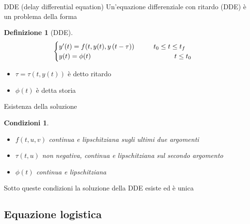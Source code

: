 \documentclass[intlimits]{beamer}
\numberwithin{equation}{section}
\theoremstyle{plain}
\newtheorem{cond}{Condizioni}[section]
\theoremstyle{definition}
\newtheorem{defin}[teor]{Definizione}
\theoremstyle{remark}
\begin{document}
\begin{frame}{DDE (delay differential equation)}
 Un'equazione differenziale con ritardo (DDE) è un problema della forma

\pause

\vspace{1cm}

\begin{defin}[DDE]
$$
\begin{cases}
 y'(t)=f(t,y(t),y \left( t-\tau \right))	\hspace{1cm}	t_0 \le t \le t_f		\\
 y(t)=\phi(t)					\hspace{4.35cm}		t \le t_0
\end{cases}
$$
\end{defin}

\pause

\vspace{1cm}

\begin{itemize}[<+->]
 \item $\tau=\tau(t,y(t))$ è detto ritardo
 \item $\phi(t)$ è detta storia
\end{itemize}

\end{frame}


\begin{frame}{Esistenza della soluzione}

\pause
\begin{cond}
 \begin{itemize}[<+->]
 \item $f(t,u,v)$ continua e lipschitziana sugli ultimi due argomenti
 \item $\tau(t,u)$  non negativa, continua e lipschitziana sul secondo argomento
 \item $\phi(t)$  continua e lipschitziana
\end{itemize}
\end{cond}

\pause

\vspace{1cm}
Sotto queste condizioni la soluzione della DDE esiste ed è unica
 
\end{frame}

\subsection{Equazione logistica}
\end{document}
